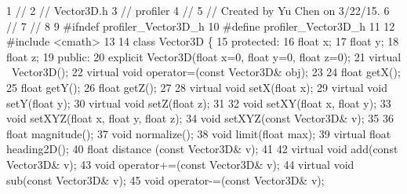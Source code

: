 \begin{DoxyCodeInclude}
1 \textcolor{comment}{//}
2 \textcolor{comment}{//  Vector3D.h}
3 \textcolor{comment}{//  profiler}
4 \textcolor{comment}{//}
5 \textcolor{comment}{//  Created by Yu Chen on 3/22/15.}
6 \textcolor{comment}{//}
7 \textcolor{comment}{//}
8 
9 \textcolor{preprocessor}{#ifndef profiler\_Vector3D\_h}
10 \textcolor{preprocessor}{#define profiler\_Vector3D\_h}
11 
12 \textcolor{preprocessor}{#include <cmath>}
13 
14 \textcolor{keyword}{class }Vector3D \{
15 \textcolor{keyword}{protected}:
16     \textcolor{keywordtype}{float} x;
17     \textcolor{keywordtype}{float} y;
18     \textcolor{keywordtype}{float} z;
19 \textcolor{keyword}{public}:
20     \textcolor{keyword}{explicit} Vector3D(\textcolor{keywordtype}{float} x=0, \textcolor{keywordtype}{float} y=0, \textcolor{keywordtype}{float} z=0);
21     \textcolor{keyword}{virtual} ~Vector3D();
22     \textcolor{keyword}{virtual} \textcolor{keywordtype}{void} operator=(\textcolor{keyword}{const} Vector3D& obj);
23     
24     \textcolor{keywordtype}{float} getX();
25     \textcolor{keywordtype}{float} getY();
26     \textcolor{keywordtype}{float} getZ();
27     
28     \textcolor{keyword}{virtual} \textcolor{keywordtype}{void} setX(\textcolor{keywordtype}{float} x);
29     \textcolor{keyword}{virtual} \textcolor{keywordtype}{void} setY(\textcolor{keywordtype}{float} y);
30     \textcolor{keyword}{virtual} \textcolor{keywordtype}{void} setZ(\textcolor{keywordtype}{float} z);
31     
32     \textcolor{keywordtype}{void} setXY(\textcolor{keywordtype}{float} x, \textcolor{keywordtype}{float} y);
33     \textcolor{keywordtype}{void} setXYZ(\textcolor{keywordtype}{float} x, \textcolor{keywordtype}{float} y, \textcolor{keywordtype}{float} z);
34     \textcolor{keywordtype}{void} setXYZ(\textcolor{keyword}{const} Vector3D& v);
35     
36     \textcolor{keywordtype}{float} magnitude();
37     \textcolor{keywordtype}{void} normalize();
38     \textcolor{keywordtype}{void} limit(\textcolor{keywordtype}{float} max);
39     \textcolor{keyword}{virtual} \textcolor{keywordtype}{float} heading2D();
40     \textcolor{keywordtype}{float} distance (\textcolor{keyword}{const} Vector3D& v);
41     
42     \textcolor{keyword}{virtual} \textcolor{keywordtype}{void} add(\textcolor{keyword}{const} Vector3D& v);
43     \textcolor{keywordtype}{void} operator+=(\textcolor{keyword}{const} Vector3D& v);
44     \textcolor{keyword}{virtual} \textcolor{keywordtype}{void} sub(\textcolor{keyword}{const} Vector3D& v);
45     \textcolor{keywordtype}{void} operator-=(\textcolor{keyword}{const} Vector3D& v);

\end{DoxyCodeInclude}
